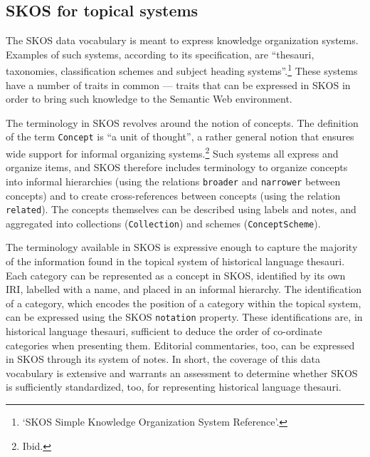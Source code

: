 %  


\subsection{SKOS for topical systems}
\label{sect:Stolk_thes-digital-form:skos}
The SKOS data vocabulary is meant to express knowledge organization systems. Examples of such systems, according to its specification, are ``thesauri, taxonomies, classification schemes and subject heading systems''.\footnote{`SKOS Simple Knowledge Organization System Reference'.} %
These systems have a number of traits in common --- traits that can be expressed in SKOS in order to bring such knowledge to the Semantic Web environment.

The terminology in SKOS revolves around the notion of concepts. The definition of the term \texttt{Concept} is ``a unit of thought'', a rather general notion that ensures wide support for informal organizing systems.\footnote{Ibid.} %
Such systems all express and organize items, and SKOS therefore includes terminology to organize concepts into informal hierarchies (using the relations \texttt{broader} and \texttt{narrower} between concepts) and to create cross-references between concepts (using the relation \texttt{related}). The concepts themselves can be described using labels and notes, and aggregated into collections (\texttt{Collection}) and schemes (\texttt{ConceptScheme}).

The terminology available in SKOS is expressive enough to capture the majority of the information found in the topical system of historical language thesauri. Each category can be represented as a concept in SKOS, identified by its own IRI, labelled with a name, and placed in an informal hierarchy. The identification of a category, which encodes the position of a category within the topical system, can be expressed using the SKOS \texttt{notation} property. These identifications are, in historical language thesauri, sufficient to deduce the order of co-ordinate categories when presenting them. Editorial commentaries, too, can be expressed in SKOS through its system of notes. In short, the coverage of this data vocabulary is extensive and warrants an assessment to determine whether SKOS is sufficiently standardized, too, for representing historical language thesauri.

